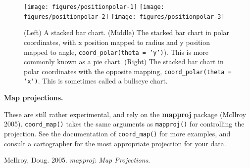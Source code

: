 \begin{Shaded}
\begin{Highlighting}[]
\StringTok{ }\NormalTok{(} \NormalTok{(}\NormalTok{), } 
\StringTok{  }\NormalTok{(} \NormalTok{))}
\StringTok{ }\NormalTok{(} \NormalTok{)}

\StringTok{ }\NormalTok{()}
\end{Highlighting}
\end{Shaded}

\begin{figure}
\texttt{[image: figures/positionpolar-1]} \texttt{[image: figures/positionpolar-2]} \texttt{[image: figures/positionpolar-3]} \caption{(Left) A stacked bar chart.  (Middle) The stacked bar chart in polar coordinates, with x position mapped to radius and y position mapped to angle, \texttt{coord\_polar(theta = 'y')}).  This is more commonly known as a pie chart.  (Right) The stacked bar chart in polar coordinates with the opposite mapping, \texttt{coord\_polar(theta = 'x')}. This is sometimes called a bullseye chart.\label{fig:polar}}
\end{figure}

\textbf{Map projections.}

These are still rather experimental, and rely on the \textbf{mapproj}
package (McIlroy 2005). \texttt{coord\_map()} takes the same arguments
as \texttt{mapproj()} for controlling the projection. See the
documentation of \texttt{coord\_map()} for more examples, and consult a
cartographer for the most appropriate projection for your data.
 

McIlroy, Doug. 2005. \emph{mapproj: Map Projections}.
